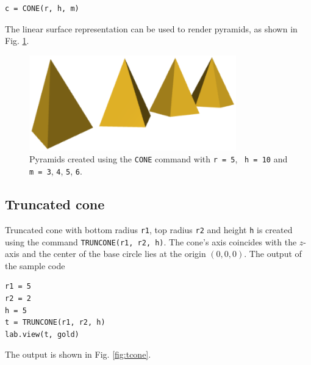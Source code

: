 \begin{bbox}
\begin{verbatim}
c = CONE(r, h, m)
\end{verbatim}
\end{bbox}
\vspace{6mm}

\noindent
The linear surface representation can be used 
to render pyramids, as shown in  Fig. \ref{fig:cone-4}.

\begin{figure}[!ht]
\begin{center}
\includegraphics[width=0.8\textwidth]{img/pyrams-111.png}
\end{center}
\vspace{-4mm}
\caption{Pyramids created using the {\tt CONE} command with {\tt r = 5},
\, {\tt h = 10} and {\tt m = 3}, {\tt 4}, {\tt 5}, {\tt 6}.}
\label{fig:cone-4}
\end{figure}
\noindent

\subsection{Truncated cone}

Truncated cone with bottom radius {\tt r1}, top radius {\tt r2} 
and height {\tt h} is created using the command 
{\tt TRUNCONE(r1, r2, h)}. The cone's axis coincides with the $z$-axis and 
the center of the base circle lies at the origin $(0, 0, 0)$.
The output of the sample code\\

\begin{bbox}
\begin{verbatim}
r1 = 5
r2 = 2
h = 5
t = TRUNCONE(r1, r2, h)
lab.view(t, gold)
\end{verbatim}
\end{bbox}
\vspace{6mm}

\noindent
The output is shown in Fig. \ref{fig:tcone}.

